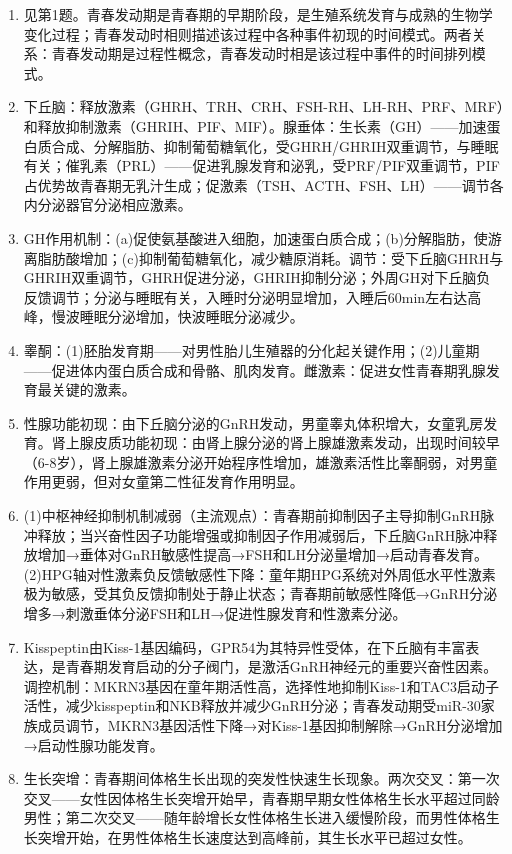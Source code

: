 \begin{enumerate}[leftmargin=*, itemsep=5pt]
    \item 见第1题。青春发动期是青春期的早期阶段，是生殖系统发育与成熟的生物学变化过程；青春发动时相则描述该过程中各种事件初现的时间模式。两者关系：青春发动期是过程性概念，青春发动时相是该过程中事件的时间排列模式。

    \item 下丘脑：释放激素（GHRH、TRH、CRH、FSH-RH、LH-RH、PRF、MRF）和释放抑制激素（GHRIH、PIF、MIF）。腺垂体：生长素（GH）——加速蛋白质合成、分解脂肪、抑制葡萄糖氧化，受GHRH/GHRIH双重调节，与睡眠有关；催乳素（PRL）——促进乳腺发育和泌乳，受PRF/PIF双重调节，PIF占优势故青春期无乳汁生成；促激素（TSH、ACTH、FSH、LH）——调节各内分泌器官分泌相应激素。

    \item GH作用机制：(a)促使氨基酸进入细胞，加速蛋白质合成；(b)分解脂肪，使游离脂肪酸增加；(c)抑制葡萄糖氧化，减少糖原消耗。调节：受下丘脑GHRH与GHRIH双重调节，GHRH促进分泌，GHRIH抑制分泌；外周GH对下丘脑负反馈调节；分泌与睡眠有关，入睡时分泌明显增加，入睡后60min左右达高峰，慢波睡眠分泌增加，快波睡眠分泌减少。

    \item 睾酮：(1)胚胎发育期——对男性胎儿生殖器的分化起关键作用；(2)儿童期——促进体内蛋白质合成和骨骼、肌肉发育。雌激素：促进女性青春期乳腺发育最关键的激素。

    \item 性腺功能初现：由下丘脑分泌的GnRH发动，男童睾丸体积增大，女童乳房发育。肾上腺皮质功能初现：由肾上腺分泌的肾上腺雄激素发动，出现时间较早（6-8岁），肾上腺雄激素分泌开始程序性增加，雄激素活性比睾酮弱，对男童作用更弱，但对女童第二性征发育作用明显。

    \item (1)中枢神经抑制机制减弱（主流观点）：青春期前抑制因子主导抑制GnRH脉冲释放；当兴奋性因子功能增强或抑制因子作用减弱后，下丘脑GnRH脉冲释放增加→垂体对GnRH敏感性提高→FSH和LH分泌量增加→启动青春发育。(2)HPG轴对性激素负反馈敏感性下降：童年期HPG系统对外周低水平性激素极为敏感，受其负反馈抑制处于静止状态；青春期前敏感性降低→GnRH分泌增多→刺激垂体分泌FSH和LH→促进性腺发育和性激素分泌。

    \item Kisspeptin由Kiss-1基因编码，GPR54为其特异性受体，在下丘脑有丰富表达，是青春期发育启动的分子阀门，是激活GnRH神经元的重要兴奋性因素。调控机制：MKRN3基因在童年期活性高，选择性地抑制Kiss-1和TAC3启动子活性，减少kisspeptin和NKB释放并减少GnRH分泌；青春发动期受miR-30家族成员调节，MKRN3基因活性下降→对Kiss-1基因抑制解除→GnRH分泌增加→启动性腺功能发育。

    \item 生长突增：青春期间体格生长出现的突发性快速生长现象。两次交叉：第一次交叉——女性因体格生长突增开始早，青春期早期女性体格生长水平超过同龄男性；第二次交叉——随年龄增长女性体格生长进入缓慢阶段，而男性体格生长突增开始，在男性体格生长速度达到高峰前，其生长水平已超过女性。


\end{enumerate}
